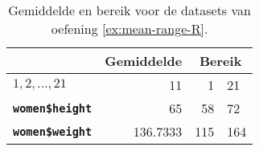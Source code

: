 \begin{table}
  \centering
  \begin{tabular}{@{}l|r|rl@{}}
    \toprule
      & \textbf{Gemiddelde} & \multicolumn{2}{c}{\textbf{Bereik}} \\
    \midrule                
                  \textbf{$1,2,...,21$} & 11       & 1    & 21    \\ 
        \textbf{\texttt{women\$height}} & 65       & 58   & 72    \\
        \textbf{\texttt{women\$weight}} & 136.7333 & 115  & 164   \\
    \bottomrule
  \end{tabular}
  \caption{Gemiddelde en bereik voor de datasets van oefening \ref{ex:mean-range-R}.}
  \label{tab:opl-mean-range-R}
\end{table}
